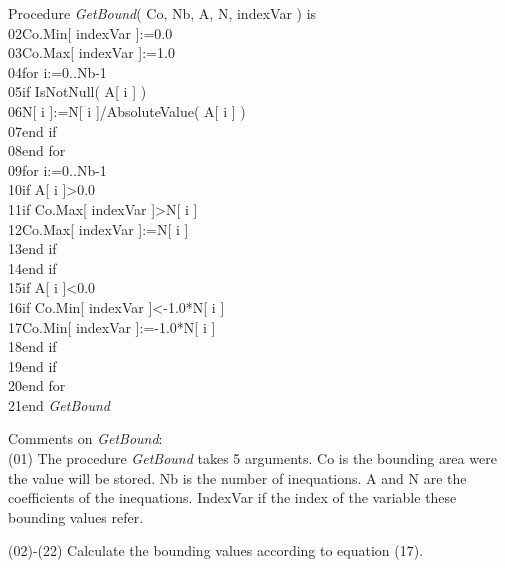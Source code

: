 \documentclass[12pt, a4paper]{article}
\begin{document}
\begin{ttfamily}
\quad Procedure {\em GetBound}( Co, Nb, A, N, indexVar ) is\\
02\quad\quad Co.Min[ indexVar ]:=0.0\\
03\quad\quad Co.Max[ indexVar ]:=1.0\\
04\quad\quad for i:=0..Nb-1\\
05\quad\quad\quad if IsNotNull( A[ i ] )\\
06\quad\quad\quad\quad N[ i ]:=N[ i ]/AbsoluteValue( A[ i ] )\\
07\quad\quad\quad end if\\
08\quad\quad end for\\
09\quad\quad for i:=0..Nb-1\\
10\quad\quad\quad if A[ i ]>0.0\\
11\quad\quad\quad\quad if Co.Max[ indexVar ]>N[ i ]\\
12\quad\quad\quad\quad\quad Co.Max[ indexVar ]:=N[ i ]\\
13\quad\quad\quad\quad end if\\
14\quad\quad\quad end if\\
15\quad\quad\quad if A[ i ]<0.0\\
16\quad\quad\quad\quad if Co.Min[ indexVar ]<-1.0*N[ i ]\\
17\quad\quad\quad\quad\quad Co.Min[ indexVar ]:=-1.0*N[ i ]\\
18\quad\quad\quad\quad end if\\
19\quad\quad\quad end if\\
20\quad\quad end for\\
21\quad end {\em GetBound}\\
\end{ttfamily}

Comments on {\em GetBound}:\\

(01) The procedure {\em GetBound} takes 5 arguments. Co is the bounding area were the value will be stored. Nb is the number of inequations. A and N are the coefficients of the inequations. IndexVar if the index of the variable these bounding values refer.

(02)-(22) Calculate the bounding values according to equation (17).\\
\end{document}
